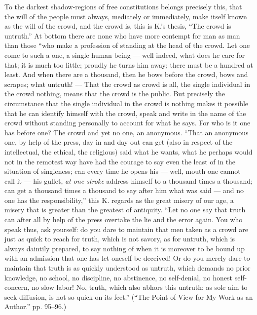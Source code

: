 \documentclass[12pt,a4paper,openany]{book}
\newcommand{\opage}[1]{\marginnote{\footnotesize\textit{[#1]}}}
\begin{document}
To the darkest shadow-regions of free constitutions belongs
precisely this, that the will of the people must always, mediately or immediately,
make itself known as the will of the crowd, and
the crowd is, this is K.'s thesis, ``The crowd is untruth.''
At bottom there are none who have more contempt for man
as man than those ``who make a profession of standing
at the head of the crowd. Let one come to such a one,
a single human being --- well indeed, what does he care
for that; it is much too little; proudly he turns him away;
there must be a hundred at least. And when there are
a thousand, then he bows before the crowd, bows and scrapes;
what untruth! --- That the crowd as crowd is
all, the single individual in the crowd nothing, means that the crowd
is the public. But precisely the circumstance that the
single individual in the crowd is nothing makes it possible that he
can identify himself with the crowd, speak and write in the name of the
crowd without standing personally to account for
what he says. For who is it one has before one?
The crowd and yet no one, an anonymous. ``That an anonymous one,
by help of the press, day in and day out can get
(also in respect of the intellectual, the ethical,
\setcounter{footnote}{0}%
\opage{12}the religious) said what he wants, what he perhaps
would not in the remotest way have had the courage to say even the
least of in the situation of singleness; can every time
he opens his --- well, mouth one cannot call it
--- his gullet, \emph{at one stroke} address himself to a thousand
times a thousand; can get a thousand times a thousand
to say after him what was said --- and no one has the responsibility,''
this K. regards as the great misery of our age, a misery
that is greater than the greatest of antiquity. ``Let no one say
that truth can after all by help of the press
overtake the lie and the error again. You who speak
thus, ask yourself: do you dare to maintain that men
taken as a crowd are just as quick to reach
for truth, which is not savory, as for
untruth, which is always daintily prepared, to say nothing of when
it is moreover to be bound up with an admission
that one has let oneself be deceived! Or do you merely dare
to maintain that truth is as quickly understood
as untruth, which demands no prior knowledge,
no school, no discipline, no abstinence, no self-denial, no honest self-concern, no slow
labor! No, truth, which also abhors this
untruth: as sole aim to seek diffusion,
is not so quick on its feet.'' (``The Point of View for My
Work as an Author.'' pp. 95--96.)
\end{document}
